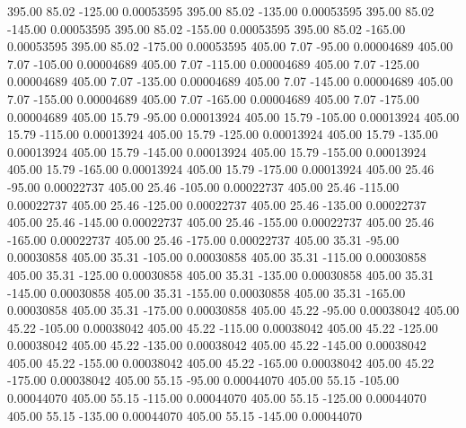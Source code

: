     395.00     85.02   -125.00     0.00053595
    395.00     85.02   -135.00     0.00053595
    395.00     85.02   -145.00     0.00053595
    395.00     85.02   -155.00     0.00053595
    395.00     85.02   -165.00     0.00053595
    395.00     85.02   -175.00     0.00053595
    405.00      7.07    -95.00     0.00004689
    405.00      7.07   -105.00     0.00004689
    405.00      7.07   -115.00     0.00004689
    405.00      7.07   -125.00     0.00004689
    405.00      7.07   -135.00     0.00004689
    405.00      7.07   -145.00     0.00004689
    405.00      7.07   -155.00     0.00004689
    405.00      7.07   -165.00     0.00004689
    405.00      7.07   -175.00     0.00004689
    405.00     15.79    -95.00     0.00013924
    405.00     15.79   -105.00     0.00013924
    405.00     15.79   -115.00     0.00013924
    405.00     15.79   -125.00     0.00013924
    405.00     15.79   -135.00     0.00013924
    405.00     15.79   -145.00     0.00013924
    405.00     15.79   -155.00     0.00013924
    405.00     15.79   -165.00     0.00013924
    405.00     15.79   -175.00     0.00013924
    405.00     25.46    -95.00     0.00022737
    405.00     25.46   -105.00     0.00022737
    405.00     25.46   -115.00     0.00022737
    405.00     25.46   -125.00     0.00022737
    405.00     25.46   -135.00     0.00022737
    405.00     25.46   -145.00     0.00022737
    405.00     25.46   -155.00     0.00022737
    405.00     25.46   -165.00     0.00022737
    405.00     25.46   -175.00     0.00022737
    405.00     35.31    -95.00     0.00030858
    405.00     35.31   -105.00     0.00030858
    405.00     35.31   -115.00     0.00030858
    405.00     35.31   -125.00     0.00030858
    405.00     35.31   -135.00     0.00030858
    405.00     35.31   -145.00     0.00030858
    405.00     35.31   -155.00     0.00030858
    405.00     35.31   -165.00     0.00030858
    405.00     35.31   -175.00     0.00030858
    405.00     45.22    -95.00     0.00038042
    405.00     45.22   -105.00     0.00038042
    405.00     45.22   -115.00     0.00038042
    405.00     45.22   -125.00     0.00038042
    405.00     45.22   -135.00     0.00038042
    405.00     45.22   -145.00     0.00038042
    405.00     45.22   -155.00     0.00038042
    405.00     45.22   -165.00     0.00038042
    405.00     45.22   -175.00     0.00038042
    405.00     55.15    -95.00     0.00044070
    405.00     55.15   -105.00     0.00044070
    405.00     55.15   -115.00     0.00044070
    405.00     55.15   -125.00     0.00044070
    405.00     55.15   -135.00     0.00044070
    405.00     55.15   -145.00     0.00044070

